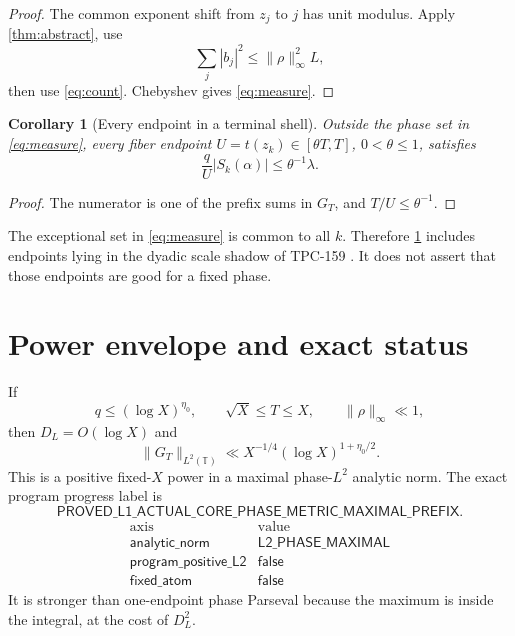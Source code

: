 \documentclass[11pt]{article}
\newtheorem{corollary}[theorem]{Corollary}
\theoremstyle{definition}
\newcommand{\T}{\mathbb T}
\newcommand{\norm}[1]{\lVert#1\rVert}
\begin{document}
\begin{proof}
The common exponent shift from \(z_j\) to \(j\) has unit modulus.
Apply \cref{thm:abstract}, use
\[
 \sum_j|b_j|^2
 \le\norm{\rho}_\infty^2L,
\]
then use \eqref{eq:count}.  Chebyshev gives \eqref{eq:measure}.
\end{proof}

\begin{corollary}[Every endpoint in a terminal shell]\label{cor:shell}
Outside the phase set in \eqref{eq:measure}, every fiber endpoint
\(U=t(z_k)\in[\theta T,T]\), \(0<\theta\le1\), satisfies
\begin{equation}
 \frac qU|S_k(\alpha)|\le\theta^{-1}\lambda.
\label{eq:shell}
\end{equation}
\end{corollary}

\begin{proof}
The numerator is one of the prefix sums in \(G_T\), and
\(T/U\le\theta^{-1}\).
\end{proof}

The exceptional set in \eqref{eq:measure} is common to all \(k\).
Therefore \cref{cor:shell} includes endpoints lying in the dyadic
scale shadow of TPC-159 \citep{WangTPC159}.  It does not assert that
those endpoints are good for a fixed phase.

\section{Power envelope and exact status}

If
\[
 q\le(\log X)^{\eta_0},\qquad
 \sqrt X\le T\le X,\qquad \norm{\rho}_\infty\ll1,
\]
then \(D_L=O(\log X)\) and
\begin{equation}
 \norm{G_T}_{L^2(\T)}
 \ll X^{-1/4}(\log X)^{1+\eta_0/2}.
\label{eq:power}
\end{equation}
This is a positive fixed-\(X\) power in a maximal phase-\(L^2\)
analytic norm.  The exact program progress label is
\[
 \mathsf{PROVED\_L1\_ACTUAL\_CORE\_
 PHASE\_METRIC\_MAXIMAL\_PREFIX}.
\]
\[
\begin{array}{c|c}
\text{axis}&\text{value}\\ \hline
\mathsf{analytic\_norm}&\mathsf{L2\_PHASE\_MAXIMAL}\\
\mathsf{program\_positive\_L2}&\mathsf{false}\\
\mathsf{fixed\_atom}&\mathsf{false}
\end{array}
\]
It is stronger than one-endpoint phase Parseval because the maximum
is inside the integral, at the cost of \(D_L^2\).
\end{document}
